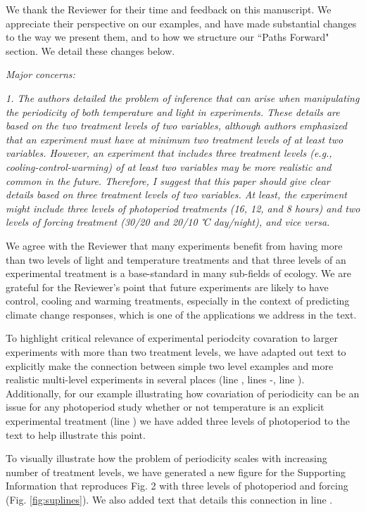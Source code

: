 \documentclass[11pt]{article}
\begin{document}
We thank the Reviewer for their time and feedback on this manuscript. We appreciate their perspective on our examples, and have made substantial changes to the way we present them, and to how we structure our ``Paths Forward" section. We detail these changes below.

\emph{Major concerns:}

\emph{1. The authors detailed the problem of inference that can arise when manipulating the periodicity of both temperature and light in experiments. These details are based on the two treatment levels of two variables, although authors emphasized that an experiment must have at minimum two treatment levels of at least two variables. However, an experiment that includes three treatment levels (e.g., cooling-control-warming) of at least two variables may be more realistic and common in the future. Therefore, I suggest that this paper should give clear details based on three treatment levels of two variables. At least, the experiment might include three levels of photoperiod treatments (16, 12, and 8 hours) and two levels of forcing treatment (30/20 and 20/10 ℃ day/night), and vice versa.}

We agree with the Reviewer that many experiments benefit from having more than two levels of light and temperature treatments and that three levels of an experimental treatment is a base-standard in many sub-fields of ecology. We are grateful for the Reviewer's point that future experiments are likely to have control, cooling and warming treatments, especially in the context of predicting climate change responses, which is one of the applications we address in the text.

To highlight critical relevance of experimental periodcity covaration to larger experiments with more than two treatment levels, we have adapted out text to explicitly make the connection between simple two level examples and more realistic multi-level experiments in several places (line , lines -, line ). Additionally, for our example illustrating how covariation of periodicity can be an issue for any photoperiod study whether or not temperature is an explicit experimental treatment (line ) we have added three levels of photoperiod to the text to help illustrate this point. 

To visually illustrate how the problem of periodicity scales with increasing number of treatment levels, we have generated a new figure for the Supporting Information that reproduces Fig. 2 with three levels of photoperiod and forcing (Fig. \ref{fig:suplines}). We also added text that details this connection in line .
\end{document}

